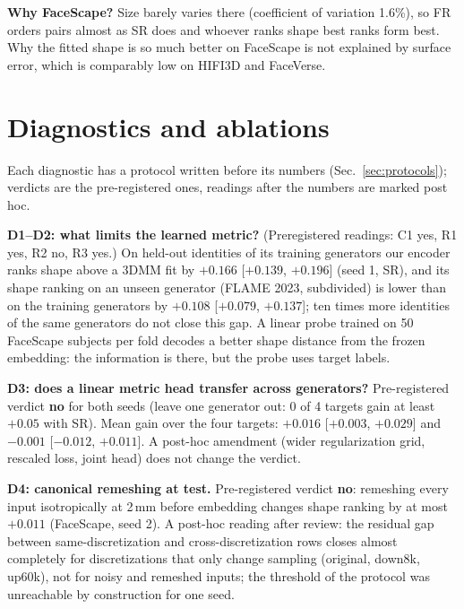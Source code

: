 \documentclass[10pt,twocolumn,letterpaper]{article}
\begin{document}
\textbf{Why FaceScape?} Size barely varies there (coefficient of variation 1.6\%), so FR orders pairs almost as SR does and whoever ranks shape best ranks form best. Why the fitted shape is so much better on FaceScape is not explained by surface error, which is comparably low on HIFI3D and FaceVerse.

\FloatBarrier
\section{Diagnostics and ablations}
\label{sec:diagnostics}
Each diagnostic has a protocol written before its numbers (Sec.~\ref{sec:protocols}); verdicts are the pre-registered ones, readings after the numbers are marked post hoc.

\textbf{D1--D2: what limits the learned metric?} (Preregistered readings: C1 yes, R1 yes, R2 no, R3 yes.) On held-out identities of its training generators our encoder ranks shape above a 3DMM fit by $+0.166$ [$+0.139$, $+0.196$] (seed 1, SR), and its shape ranking on an unseen generator (FLAME 2023, subdivided) is lower than on the training generators by $+0.108$ [$+0.079$, $+0.137$]; ten times more identities of the same generators do not close this gap. A linear probe trained on 50 FaceScape subjects per fold decodes a better shape distance from the frozen embedding: the information is there, but the probe uses target labels.

\textbf{D3: does a linear metric head transfer across generators?} Pre-registered verdict \textbf{no} for both seeds (leave one generator out: 0 of 4 targets gain at least $+0.05$ with SR). Mean gain over the four targets: $+0.016$ [$+0.003$, $+0.029$] and $-0.001$ [$-0.012$, $+0.011$]. A post-hoc amendment (wider regularization grid, rescaled loss, joint head) does not change the verdict.

\textbf{D4: canonical remeshing at test.} Pre-registered verdict \textbf{no}: remeshing every input isotropically at 2\,mm before embedding changes shape ranking by at most $+0.011$ (FaceScape, seed 2). A post-hoc reading after review: the residual gap between same-discretization and cross-discretization rows closes almost completely for discretizations that only change sampling (original, down8k, up60k), not for noisy and remeshed inputs; the threshold of the protocol was unreachable by construction for one seed.
\end{document}
